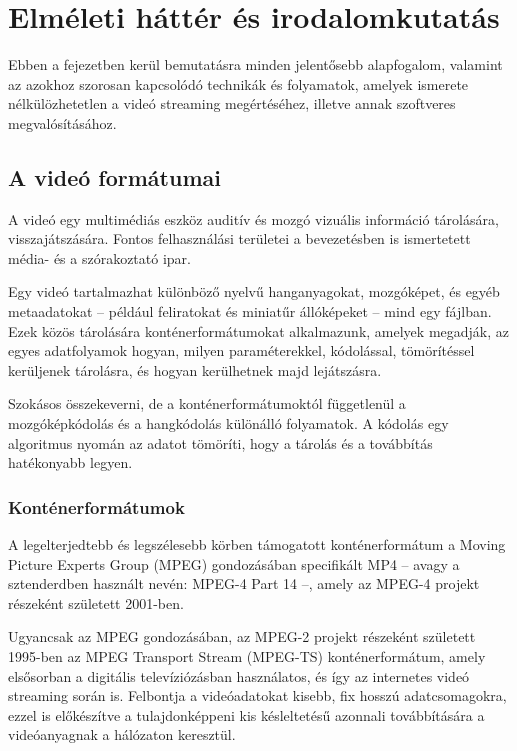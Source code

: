 \chapter{Elméleti háttér és irodalomkutatás}

Ebben a fejezetben kerül bemutatásra minden jelentősebb alapfogalom, valamint az azokhoz szorosan kapcsolódó technikák és folyamatok, amelyek ismerete nélkülözhetetlen a videó streaming megértéséhez, illetve annak szoftveres megvalósításához.

\section{A videó formátumai}

A videó egy multimédiás eszköz auditív és mozgó vizuális információ tárolására, visszajátszására. Fontos felhasználási területei a bevezetésben is ismertetett média- és a szórakoztató ipar.

Egy videó tartalmazhat különböző nyelvű hanganyagokat, mozgóképet, és egyéb metaadatokat -- például feliratokat és miniatűr állóképeket -- mind egy fájlban. Ezek közös tárolására konténerformátumokat alkalmazunk, amelyek megadják, az egyes adatfolyamok hogyan, milyen paraméterekkel, kódolással, tömörítéssel kerüljenek tárolásra, és hogyan kerülhetnek majd lejátszásra.

Szokásos összekeverni, de a konténerformátumoktól függetlenül a mozgóképkódolás és a hangkódolás különálló folyamatok. A kódolás egy algoritmus nyomán az adatot tömöríti, hogy a tárolás és a továbbítás hatékonyabb legyen.

\subsection{Konténerformátumok}

A legelterjedtebb és legszélesebb körben támogatott konténerformátum a Moving Picture Experts Group (MPEG) gondozásában specifikált MP4 -- avagy a sztenderdben használt nevén: MPEG-4 Part 14 --, amely az MPEG-4 projekt részeként született 2001-ben.

Ugyancsak az MPEG gondozásában, az MPEG-2 projekt részeként született 1995-ben az MPEG Transport Stream (MPEG-TS) konténerformátum, amely elsősorban a digitális televíziózásban használatos, és így az internetes videó streaming során is. Felbontja a videóadatokat kisebb, fix hosszú adatcsomagokra, ezzel is előkészítve a tulajdonképpeni kis késleltetésű azonnali továbbítására a videóanyagnak a hálózaton keresztül.

